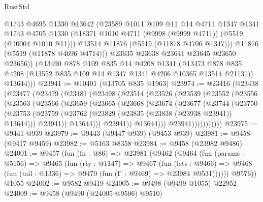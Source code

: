 \begin{lexlean}{RustStd}
\begin{coremodule}
              @1743
              @4695
              @1330
              @13642
              (@23589
                @1011
                @109
                @11
                @14
                @4711
                @1347
                @1341
                @1743
                @4705
                @1330
                (@18371 @1010 @4711 (@9998 (@9999 @4711)) (@5519 (@10004 @1010 @11)))
                @13514
                @11876
                (@5519 (@11878 @4706 @1347)))
              @11876
              (@5519 (@11878 @4696 @4714)))
            @23635
            @23638
            @23641
            @23645
            @23650
            @23656))
        (@13490
          @878
          @109
          @835
          @14
          @4208
          @1341
          (@13473 @878 @835 @4208 (@13552 @835 @109 @14 @1347 @1341 @4206 @10365 @13514 @21131))
          @13644)))
@23941 := @10401 (@13705 @835 @1963)
@23974 := @23416
    (@23438
      (@23477
        (@23479
          (@23481
            (@23498
              (@23514
                (@23526
                  (@23539
                    (@23552
                      (@23556
                        (@23563
                          (@23566
                            (@23659
                              (@23665
                                (@23668
                                  (@23674
                                    (@23677
                                      (@23744
                                        (@23750
                                          (@23753
                                            (@23759
                                              (@23762
                                                (@23829 (@23835 (@23838 (@23938 @23941)) @13644)))
                                              @23941))
                                          @13644)))
                                    @23941))
                                @13644)))
                          @23941)))))))))))
@23975 := @9441 @939
@23979 := @9443 (@9447 @939) (@9453 @939)
@23981 := @9458 (@9417 @9459)
@23982 := @5163 @8358
@23984 := @9458 (@23982 @9486)
@24001 := @9457
    (fun (fn : @86) =>
    @23981
      (@9462
        (@9464
          (fun (params : @5156) =>
          @9465
            (fun (rty : @1147) =>
            @9467
              (fun (lets : @9466) =>
              @9468 (fun (tail : @1336) => @9470 (fun (Γ : @9469) => @23984 @9531))))))
        @9576))
    @1055
@24002 := @9582 @9419
@24005 := @9498 (@9499 @1055) @22952
@24009 := @9458 (@9490 (@24005 @9506) @9510)

\end{coremodule}
\end{lexlean}
